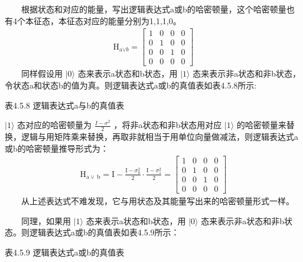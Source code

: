 \documentclass[a4paper,11pt,english]{sphinxmanual}
\begin{document}
\sphinxAtStartPar
  根据状态和对应的能量，写出逻辑表达式a或b的哈密顿量，这个哈密顿量也有4个本征态，本征态对应的能量分别为1,1,1,0。
\begin{equation*}
\begin{split}\mathrm{H}_{\mathrm{a}{\mathrm{\lor} b}}=\left[\begin{array}{cccc} 1 & 0 & 0 & 0 \\ 0 & 1 & 0 & 0 \\ 0 & 0 & 1 & 0 \\ 0 & 0 & 0 & 0 \end{array}\right]\end{split}
\end{equation*}
\sphinxAtStartPar
  同样假设用 \(|0 \rangle\) 态来表示a状态和b状态，用 \(|1 \rangle\) 态来表示非a状态和非b状态，令状态a和状态b的值为真。则逻辑表达式a或b的真值表如表4.5.8所示:

\begin{center}表4.5.8 逻辑表达式a与b的真值表
\end{center}

\sphinxAtStartPar
\(|1 \rangle\) 态对应的哈密顿量为  \(\frac{I-\sigma^{2}}{2}\) ，将非a状态和非b状态用对应 \(|1 \rangle\) 的哈密顿量来替换，逻辑与用矩阵乘来替换，再取非就相当于用单位向量做减法，则逻辑表达式a或b的哈密顿量推导形式为：
\begin{equation*}
\begin{split}\mathrm{H}_{\mathrm{a} \lor \mathrm{~b}}=\mathrm{I}-\frac{\mathrm{I}-\sigma_{0}^{2}}{2} \cdot \frac{\mathrm{I}-\sigma_{1}^{2}}{2}=\left[\begin{array}{llll} 1 & 0 & 0 & 0 \\ 0 & 1 & 0 & 0 \\ 0 & 0 & 1 & 0 \\ 0 & 0 & 0 & 0 \end{array}\right]\end{split}
\end{equation*}
\sphinxAtStartPar
  从上述表达式不难发现，它与用状态及其能量写出来的哈密顿量形式一样。

\sphinxAtStartPar
  同理，如果用 \(|1 \rangle\) 态来表示a状态和b状态，用 \(|0 \rangle\) 态来表示非a状态和非b状态。则逻辑表达式a或b的真值表如表4.5.9所示：

\begin{center}表4.5.9 逻辑表达式a或b的真值表
\end{center}
\end{document}
